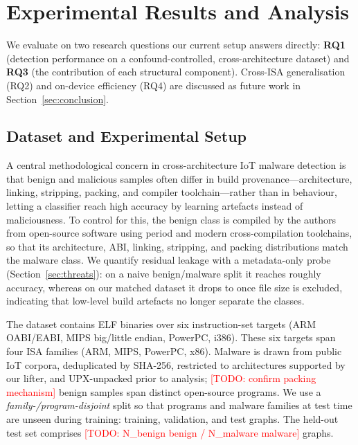 \documentclass{llncs}
\begin{document}
\section{Experimental Results and Analysis}
\label{sec:experiments}

We evaluate  on two research questions our current setup
answers directly: \textbf{RQ1} (detection performance on a
confound-controlled, cross-architecture dataset) and \textbf{RQ3} (the
contribution of each structural component). Cross-ISA generalisation
(RQ2) and on-device efficiency (RQ4) are discussed as future work in
Section~\ref{sec:conclusion}.

\subsection{Dataset and Experimental Setup}
\label{sec:setup}

A central methodological concern in cross-architecture IoT malware
detection is that benign and malicious samples often differ in build
provenance---architecture, linking, stripping, packing, and compiler
toolchain---rather than in behaviour, letting a classifier reach high
accuracy by learning artefacts instead of maliciousness. To control for
this, the benign class is compiled by the authors from open-source
software using period and modern cross-compilation toolchains, so that its
architecture, ABI, linking, stripping, and packing distributions match
the malware class. We quantify residual leakage with a metadata-only
probe (Section~\ref{sec:threats}): on a naive benign/malware split it
reaches roughly \probeOld{} accuracy, whereas on our matched dataset it
drops to \probeNew{} once file size is excluded, indicating that low-level
build artefacts no longer separate the classes.

The dataset contains \dsTotal{} ELF binaries over six instruction-set
targets (ARM OABI/EABI, MIPS big/little endian, PowerPC, i386). These six targets span four ISA families (ARM, MIPS, PowerPC, x86). Malware is
drawn from public IoT corpora, deduplicated by SHA-256, restricted to
architectures supported by our lifter, and UPX-unpacked prior to analysis;
\textcolor{red}{[TODO: confirm packing mechanism]}
benign samples span \dsBenignProg{} distinct open-source programs. We use a
\emph{family-/program-disjoint} split so that programs and malware
families at test time are unseen during training: \dsTrain{} training,
\dsVal{} validation, and \dsTest{} test graphs. The held-out test set comprises
\textcolor{red}{[TODO: N\_benign benign / N\_malware malware]} graphs.
\end{document}
